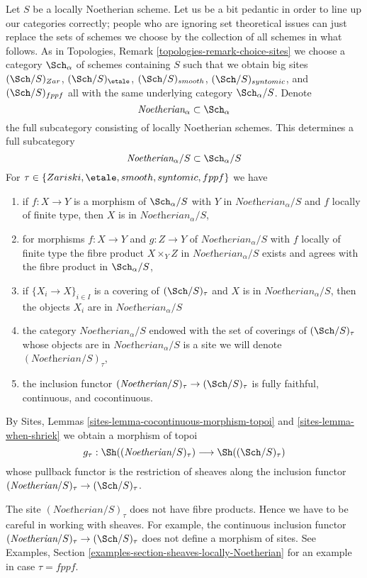 \medskip\noindent
Let $S$ be a locally Noetherian scheme. Let us be a bit pedantic in order
to line up our categories correctly; people who are ignoring set theoretical
issues can just replace the sets of schemes we choose by the collection
of all schemes in what follows. As in
Topologies, Remark \ref{topologies-remark-choice-sites}
we choose a category $\Sch_\alpha$ of schemes containing
$S$ such that we obtain big sites $(\Sch/S)_{Zar}$,
$(\Sch/S)_\etale$, $(\Sch/S)_{smooth}$, $(\Sch/S)_{syntomic}$,
and $(\Sch/S)_{fppf}$ all with the same underlying
category $\Sch_\alpha/S$. Denote
$$
\textit{Noetherian}_\alpha \subset \Sch_\alpha
$$
the full subcategory consisting of locally Noetherian schemes.
This determines a full subcategory
$$
\textit{Noetherian}_\alpha/S \subset \Sch_\alpha/S
$$
For $\tau \in \{Zariski, \etale, smooth, syntomic, fppf\}$ we have
\begin{enumerate}
\item if $f : X \to Y$ is a morphism of $\Sch_\alpha/S$
with $Y$ in $\textit{Noetherian}_\alpha/S$ and
$f$ locally of finite type, then $X$ is in $\textit{Noetherian}_\alpha/S$,
\item for morphisms $f : X \to Y$ and $g : Z \to Y$ of
$\textit{Noetherian}_\alpha/S$ with $f$ locally of finite type
the fibre product $X \times_Y Z$ in $\textit{Noetherian}_\alpha/S$
exists and agrees with the fibre product in $\Sch_\alpha/S$,
\item if $\{X_i \to X\}_{i \in I}$ is a covering of
$(\Sch/S)_\tau$ and $X$ is in $\textit{Noetherian}_\alpha/S$,
then the objects $X_i$ are in $\textit{Noetherian}_\alpha/S$
\item the category $\textit{Noetherian}_\alpha/S$ endowed
with the set of coverings of $(\Sch/S)_\tau$ whose objects
are in $\textit{Noetherian}_\alpha/S$ is a site
we will denote $(\textit{Noetherian}/S)_\tau$,
\item the inclusion functor
$(\textit{Noetherian}/S)_\tau \to (\Sch/S)_\tau$
is fully faithful, continuous, and cocontinuous.
\end{enumerate}
By Sites, Lemmas \ref{sites-lemma-cocontinuous-morphism-topoi} and
\ref{sites-lemma-when-shriek} we obtain a morphism of topoi
$$
g_\tau : \Sh((\textit{Noetherian}/S)_\tau) \longrightarrow \Sh((\Sch/S)_\tau)
$$
whose pullback functor is the restriction of sheaves along
the inclusion functor $(\textit{Noetherian}/S)_\tau \to (\Sch/S)_\tau$.

\begin{remark}[Warning]
\label{remark-no-fibre-products}
The site $(\textit{Noetherian}/S)_\tau$ does not have fibre products.
Hence we have to be careful in working with sheaves. For example,
the continuous inclusion functor
$(\textit{Noetherian}/S)_\tau \to (\Sch/S)_\tau$
does not define a morphism of sites. See
Examples, Section \ref{examples-section-sheaves-locally-Noetherian}
for an example in case $\tau = fppf$.
\end{remark}

